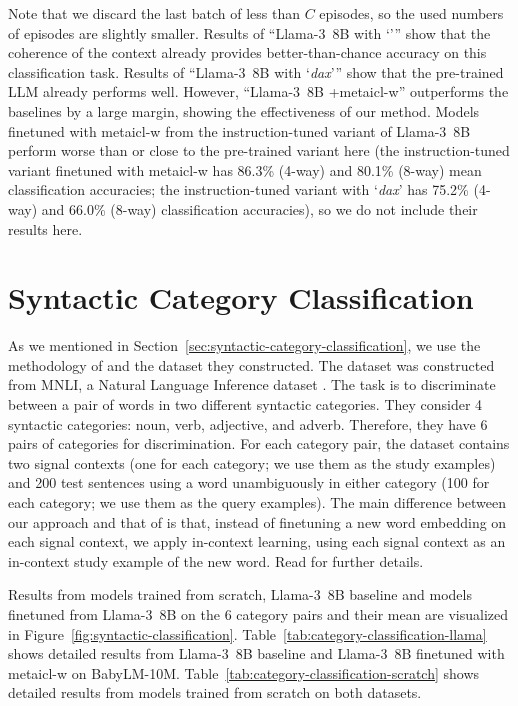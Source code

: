 \documentclass{article}
\begin{document}
\begin{table*}[t]
{Note that we discard the last batch of less than $C$ episodes, so the used numbers of episodes are slightly smaller.
Results of ``\mbox{Llama-3 8B} with `''' show that the coherence of the context already provides better-than-chance accuracy on this classification task.
Results of ``\mbox{Llama-3 8B} with `\textit{dax}''' show that the pre-trained LLM already performs well.
However, ``\mbox{Llama-3 8B} +\ac{metaicl-w}'' outperforms the baselines by a large margin, showing the effectiveness of our method.
Models finetuned with \ac{metaicl-w} from the instruction-tuned variant of \mbox{Llama-3 8B} perform worse than or close to the pre-trained variant here
(the instruction-tuned variant finetuned with \ac{metaicl-w} has 86.3\% (4-way) and 80.1\% (8-way) mean classification accuracies; the instruction-tuned variant with `\textit{dax}' has 75.2\% (4-way) and 66.0\% (8-way) classification accuracies),
so we do not include their results here.
}
\label{tab:word-classification}
\end{table*}


\clearpage
\section{Syntactic Category Classification}
\label{app:syntactic-category-classification}
As we mentioned in Section~\ref{sec:syntactic-category-classification}, we use the methodology of \citet{kim-smolensky-2021-testing} and the dataset they constructed.
The dataset was constructed from MNLI, a Natural Language Inference dataset \citep{MNLI}.
The task is to discriminate between a pair of words in two different syntactic categories.
They consider 4 syntactic categories: noun, verb, adjective, and adverb.
Therefore, they have 6 pairs of categories for discrimination.
For each category pair, the dataset contains two signal contexts (one for each category; we use them as the study examples) and 200 test sentences using a word unambiguously in either category (100 for each category; we use them as the query examples).
The main difference between our approach and that of \citet{kim-smolensky-2021-testing} is that, instead of finetuning a new word embedding on each signal context, we apply in-context learning, using each signal context as an in-context study example of the new word.
Read \citet{kim-smolensky-2021-testing} for further details.

Results from models trained from scratch, \mbox{Llama-3 8B} baseline and models finetuned from \mbox{Llama-3 8B} on the 6 category pairs and their mean are visualized in Figure~\ref{fig:syntactic-classification}.
Table~\ref{tab:category-classification-llama} shows detailed results from \mbox{Llama-3 8B} baseline and \mbox{Llama-3 8B} finetuned with \ac{metaicl-w} on BabyLM-10M.
Table~\ref{tab:category-classification-scratch} shows detailed results from models trained from scratch on both datasets.
\end{document}
